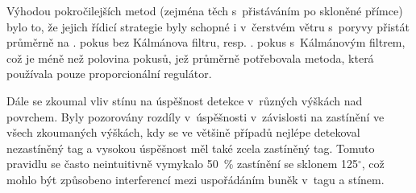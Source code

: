 Výhodou pokročilejších metod (zejména těch s~přistáváním po skloněné přímce) bylo to, že jejich řídicí strategie byly schopné i v~čerstvém větru s~poryvy přistát průměrně na \landingRetriesMeanLAPILvitrIV. pokus bez Kálmánova filtru, resp. \landingRetriesMeanKAPILvitrIV. pokus s~Kálmánovým filtrem, což je méně než polovina pokusů, jež průměrně potřebovala metoda, která používala pouze proporcionální regulátor.

Dále se zkoumal vliv stínu na úspěšnost detekce v~různých výškách nad povrchem. Byly pozorovány rozdíly v~úspěšnosti v~závislosti na zastínění ve všech zkoumaných výškách, kdy se ve většině případů nejlépe detekoval nezastíněný tag a vysokou úspěšnost měl také zcela zastíněný tag. Tomuto pravidlu se často neintuitivně vymykalo 50~\% zastínění se sklonem 125$^\circ$, což mohlo být způsobeno interferencí mezi uspořádáním buněk v~tagu a stínem.
